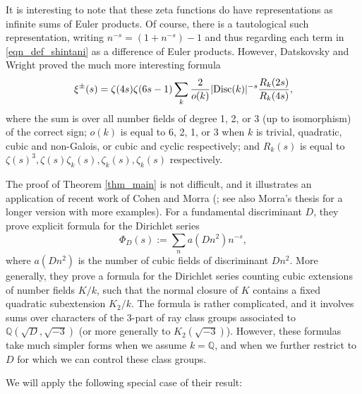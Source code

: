 \documentclass[12pt]{amsart}
\theoremstyle{remark}
\numberwithin{theorem}{section} \numberwithin{equation}{section}
\newcommand{\Q}{\mathbb{Q}}
\newcommand{\Disc}{\textnormal{Disc}}
\begin{document}
It is interesting to note that these zeta functions do have representations as infinite sums of Euler
products. Of course, there is a tautological such representation, writing
$n^{-s} = (1 + n^{-s}) - 1$
and thus regarding each term in \eqref{eqn_def_shintani} as a difference of Euler products.
However, Datskovsky and Wright \cite{DW2} proved the much more interesting formula
\begin{equation}\label{eqn_dw2}
\xi^{\pm}(s) = \zeta(4s) \zeta(6s - 1) \sum_k \frac{2}{o(k)} |\Disc(k)|^{-s} \frac{R_k(2s)}{R_k(4s)},
\end{equation}
where the sum is over all number fields of degree 1, 2, or 3 (up to isomorphism) of the correct sign; $o(k)$ is equal to
6, 2, 1, or 3 when $k$ is trivial, quadratic, cubic and non-Galois, or cubic and cyclic respectively;
and $R_k(s)$ is equal
to $\zeta(s)^3, \zeta(s) \zeta_k(s), \zeta_k(s), \zeta_k(s)$ respectively.

The proof of Theorem \ref{thm_main} is not difficult, and it illustrates an application
of recent work of Cohen and Morra (\cite{CM}; see also Morra's thesis \cite{M} for a longer version with more examples). 
For a fundamental discriminant $D$, 
they prove explicit formula for the Dirichlet series
\begin{equation}
\Phi_D(s) := \sum_n a(Dn^2) n^{-s},
\end{equation}
where $a(Dn^2)$ is the number of cubic fields of discriminant $D n^2$. More generally, they prove
a formula for the Dirichlet series counting cubic extensions of number fields 
$K/k$, such that the normal
closure of $K$ contains a fixed quadratic subextension $K_2/k$. The formula is rather complicated, and it
involves sums over characters of the 3-part of ray class groups associated to $\Q(\sqrt{D}, \sqrt{-3})$
(or more generally to $K_2(\sqrt{-3})$). However, these formulas take much simpler forms when we assume $k = \Q$, and when
we further restrict
to $D$ for which we can control these class groups.

We will apply the following special case of their result:
\end{document}

